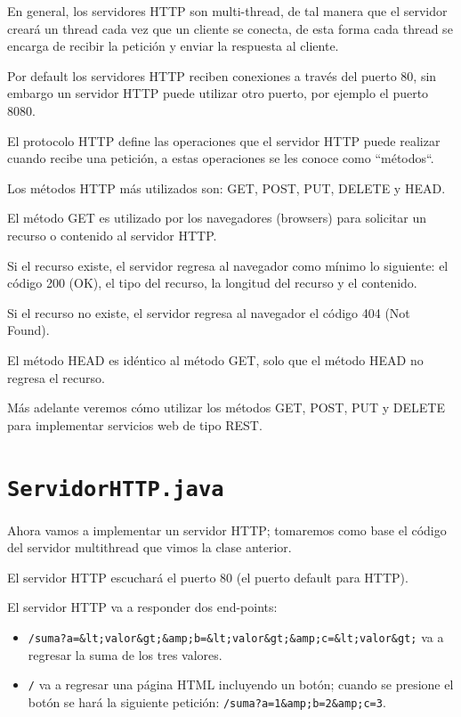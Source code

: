 En general, los servidores HTTP son multi-thread, de tal manera que el servidor creará un thread cada vez que un cliente se conecta, de esta forma cada thread se encarga de recibir la petición y enviar la respuesta al cliente.

Por default los servidores HTTP reciben conexiones a través del puerto 80, sin embargo un servidor HTTP puede utilizar otro puerto, por ejemplo el puerto 8080.

El protocolo HTTP define las operaciones que el servidor HTTP puede realizar cuando recibe una petición, a estas operaciones se les conoce como ``métodos``.

Los métodos HTTP más utilizados son: GET, POST, PUT, DELETE y HEAD.

El método GET es utilizado por los navegadores (browsers) para solicitar un recurso o contenido al servidor HTTP.

Si el recurso existe, el servidor regresa al navegador como mínimo lo siguiente: el código 200 (OK), el tipo del recurso, la longitud del recurso y el contenido.

Si el recurso no existe, el servidor regresa al navegador el código 404 (Not Found).

El método HEAD es idéntico al método GET, solo que el método HEAD no regresa el recurso.

Más adelante veremos cómo utilizar los métodos GET, POST, PUT y DELETE para implementar servicios web de tipo REST.

\section{\texttt{ServidorHTTP.java}}

Ahora vamos a implementar un servidor HTTP; tomaremos como base el código del servidor multithread que vimos la clase anterior.

El servidor HTTP escuchará el puerto 80 (el puerto default para HTTP).

El servidor HTTP va a responder dos end-points:

\begin{itemize}

\item \texttt{/suma?a=\&lt;valor\&gt;\&amp;b=\&lt;valor\&gt;\&amp;c=\&lt;valor\&gt;} va a regresar la suma de los tres valores.

\item \texttt{/} va a regresar una página HTML incluyendo un botón; cuando se presione el botón se hará la siguiente petición: \texttt{/suma?a=1\&amp;b=2\&amp;c=3}.

\end{itemize}

